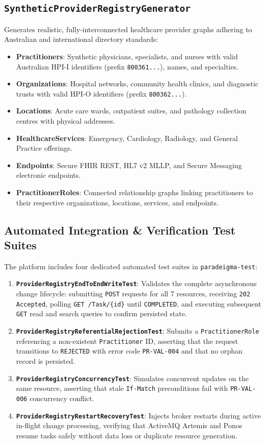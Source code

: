 \subsection{\texttt{SyntheticProviderRegistryGenerator}}
Generates realistic, fully-interconnected healthcare provider graphs adhering to Australian and international directory standards:
\begin{itemize}
    \item \textbf{Practitioners}: Synthetic physicians, specialists, and nurses with valid Australian HPI-I identifiers (prefix \texttt{800361...}), names, and specialties.
    \item \textbf{Organizations}: Hospital networks, community health clinics, and diagnostic trusts with valid HPI-O identifiers (prefix \texttt{800362...}).
    \item \textbf{Locations}: Acute care wards, outpatient suites, and pathology collection centres with physical addresses.
    \item \textbf{HealthcareServices}: Emergency, Cardiology, Radiology, and General Practice offerings.
    \item \textbf{Endpoints}: Secure FHIR REST, HL7 v2 MLLP, and Secure Messaging electronic endpoints.
    \item \textbf{PractitionerRoles}: Connected relationship graphs linking practitioners to their respective organizations, locations, services, and endpoints.
\end{itemize}

\subsection{Automated Integration \& Verification Test Suites}
The platform includes four dedicated automated test suites in \texttt{paradeigma-test}:
\begin{enumerate}
    \item \textbf{\texttt{ProviderRegistryEndToEndWriteTest}}: Validates the complete asynchronous change lifecycle: submitting \texttt{POST} requests for all 7 resources, receiving \texttt{202 Accepted}, polling \texttt{GET /Task/\{id\}} until \texttt{COMPLETED}, and executing subsequent \texttt{GET} read and search queries to confirm persisted state.
    \item \textbf{\texttt{ProviderRegistryReferentialRejectionTest}}: Submits a \texttt{PractitionerRole} referencing a non-existent \texttt{Practitioner} ID, asserting that the request transitions to \texttt{REJECTED} with error code \texttt{PR-VAL-004} and that no orphan record is persisted.
    \item \textbf{\texttt{ProviderRegistryConcurrencyTest}}: Simulates concurrent updates on the same resource, asserting that stale \texttt{If-Match} preconditions fail with \texttt{PR-VAL-006} concurrency conflict.
    \item \textbf{\texttt{ProviderRegistryRestartRecoveryTest}}: Injects broker restarts during active in-flight change processing, verifying that ActiveMQ Artemis and Ponos resume tasks safely without data loss or duplicate resource generation.
\end{enumerate}


